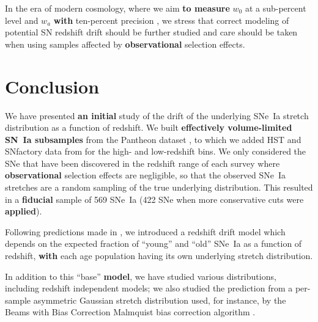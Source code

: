 \documentclass[referee]{aa}
\begin{document}
In the era of modern cosmology, where we aim \textbf{to measure} $w_0$ at a
sub-percent level and $w_a$ \textbf{with} ten-percent precision
\citep[e.g.,][]{lsstpaper}, we stress that correct modeling of potential SN
redshift drift should be further studied and care should be taken when using
samples affected by \textbf{observational} selection effects.

\section{Conclusion}\label{sec:ccl}

We have presented \textbf{an initial} study of the drift of the underlying
SNe~Ia stretch distribution as a function of redshift. We built
\textbf{effectively volume-limited SN~Ia subsamples} from the Pantheon dataset
\citep[][SDSS, PS1 and SNLS]{scolnic2018a}, to which we added HST and SNfactory
data from \cite{rigault2020} for the high- and low-redshift bins. We only
considered the SNe that have been discovered in the redshift range of each
survey where \textbf{observational} selection effects are negligible, so that
the observed SNe~Ia stretches are a random sampling of the true underlying
distribution. This resulted in a \textbf{fiducial} sample of 569 SNe~Ia (422 SNe
when more conservative cuts were \textbf{applied}).

Following predictions made in \cite{rigault2020}, we introduced a redshift drift
model which depends on the expected fraction of ``young'' and ``old'' SNe~Ia as
a function of redshift, \textbf{with} each age population having its own
underlying stretch distribution.

In addition to this ``base'' \textbf{model}, we have studied various
distributions, including redshift independent models; we also studied the
prediction from a per-sample asymmetric Gaussian stretch distribution used, for
instance, by the Beams with Bias Correction Malmquist bias correction algorithm
\citep{scolnic2016, kessler2017}.
\end{document}

